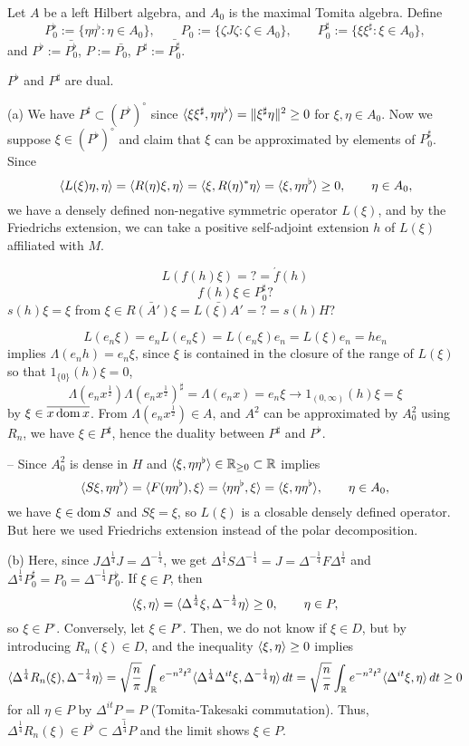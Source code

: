 \documentclass{../../large}
\begin{document}
\begin{prb}
Let $A$ be a left Hilbert algebra, and $A_0$ is the maximal Tomita algebra.
Define
\[P_0^\flat:=\{\eta\eta^\flat:\eta\in A_0\},\qquad P_0:=\{\zeta J\zeta:\zeta\in A_0\},\qquad P_0^\sharp:=\{\xi\xi^\sharp:\xi\in A_0\},\]
and $P^\flat:=\bar{P_0^\flat}$, $P:=\bar{P_0}$, $P^\sharp:=\bar{P_0^\sharp}$.
\begin{parts}
\item $P^\flat$ and $P^\sharp$ are dual.
\end{parts}
\end{prb}
\begin{pf}
(a)
We have $P^\sharp\subset(P^\flat)^\circ$ since $\langle\xi\xi^\sharp,\eta\eta^\flat\rangle=\|\xi^\sharp\eta\|^2\ge0$ for $\xi,\eta\in A_0$.
Now we suppose $\xi\in(P^\flat)^\circ$ and claim that $\xi$ can be approximated by elements of $P_0^\sharp$.
Since
\[\langle L(\xi)\eta,\eta\rangle=\langle R(\eta)\xi,\eta\rangle=\langle\xi,R(\eta)^*\eta\rangle=\langle\xi,\eta\eta^\flat\rangle\ge0,\qquad\eta\in A_0,\]
we have a densely defined non-negative symmetric operator $L(\xi)$, and by the Friedrichs extension, we can take a positive self-adjoint extension $h$ of $L(\xi)$ affiliated with $M$.

\[L(f(h)\xi)=?=\acute f(h)\]
\[f(h)\xi\in P_0^\sharp?\]
$s(h)\xi=\xi$ from $\xi\in\bar{R(A')\xi}=\bar{L(\xi)A'}=?=s(h)H$?

\[L(e_n\xi)=e_nL(e_n\xi)=L(e_n\xi)e_n=L(\xi)e_n=he_n\]
implies $\Lambda(e_nh)=e_n\xi$, since $\xi$ is contained in the closure of the range of $L(\xi)$ so that $1_{\{0\}}(h)\xi=0$,
\[\Lambda(e_nx^{\frac12})\Lambda(e_nx^{\frac12})^\sharp=\Lambda(e_nx)=e_n\xi\to1_{(0,\infty)}(h)\xi=\xi\]
by $\xi\in\overline{x\operatorname{dom} x}$.
From $\Lambda(e_nx^{\frac12})\in A$, and $A^2$ can be approximated by $A_0^2$ using $R_n$, we have $\xi\in P^\sharp$, hence the duality between $P^\sharp$ and $P^\flat$.

--
Since $A_0^2$ is dense in $H$ and $\langle\xi,\eta\eta^\flat\rangle\in\mathbb{R}_{\ge0}\subset\mathbb{R}$ implies
\[\langle S\xi,\eta\eta^\flat\rangle=\langle F(\eta\eta^\flat),\xi\rangle=\langle\eta\eta^\flat,\xi\rangle=\langle\xi,\eta\eta^\flat\rangle,\qquad\eta\in A_0,\]
we have $\xi\in\operatorname{dom} S$ and $S\xi=\xi$, so $L(\xi)$ is a closable densely defined operator.
But here we used Friedrichs extension instead of the polar decomposition.

(b)
Here, since $J\Delta^{\frac14}J=\Delta^{-\frac14}$, we get $\Delta^{\frac14}S\Delta^{-\frac14}=J=\Delta^{-\frac14}F\Delta^{\frac14}$ and $\Delta^{\frac14}P_0^\sharp=P_0=\Delta^{-\frac14}P_0^\flat$.
If $\xi\in P$, then
\[\langle\xi,\eta\rangle=\langle\Delta^{\frac14}\xi,\Delta^{-\frac14}\eta\rangle\ge0,\qquad\eta\in P,\]
so $\xi\in P^\circ$.
Conversely, let $\xi\in P^\circ$.
Then, we do not know if $\xi\in D$, but by introducing $R_n(\xi)\in D$, and the inequality $\langle\xi,\eta\rangle\ge0$ implies
\[\langle\Delta^{\frac14}R_n(\xi),\Delta^{-\frac14}\eta\rangle=\sqrt{\frac n\pi}\int_{\mathbb{R}} e^{-n^2t^2}\langle\Delta^{\frac14}\Delta^{it}\xi,\Delta^{-\frac14}\eta\rangle\,dt=\sqrt{\frac n\pi}\int_{\mathbb{R}} e^{-n^2t^2}\langle\Delta^{it}\xi,\eta\rangle\,dt\ge0\]
for all $\eta\in P$ by $\Delta^{it}P=P$ (Tomita-Takesaki commutation).
Thus, $\Delta^{\frac14}R_n(\xi)\in P^\flat\subset\bar{\Delta^{\frac14}P}$ and the limit shows $\xi\in P$.


\end{pf}
\end{document}
